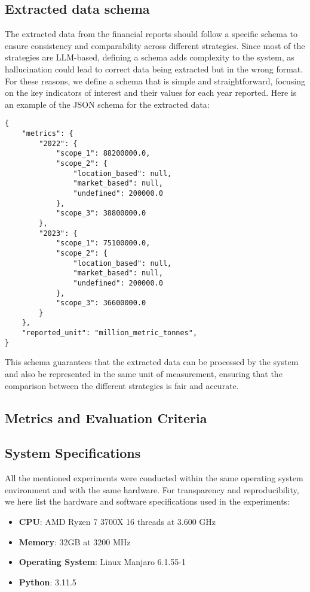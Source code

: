 \documentclass[english, 12pt, a4paper, elec, utf8, a-2b, online]{aaltothesis}
\begin{document}
\subsection{Extracted data schema}

The extracted data from the financial reports should follow a specific schema to ensure consistency and comparability across different strategies.
Since most of the strategies are \ac{LLM}-based, defining a schema adds complexity to the system, as hallucination could lead to correct data being extracted but in the wrong format.
For these reasons, we define a schema that is simple and straightforward, focusing on the key indicators of interest and their values for each year reported.
Here is an example of the \ac{JSON} schema for the extracted data:

\begin{verbatim}
{
    "metrics": {
        "2022": {
            "scope_1": 88200000.0,
            "scope_2": {
                "location_based": null,
                "market_based": null,
                "undefined": 200000.0
            },
            "scope_3": 38800000.0
        },
        "2023": {
            "scope_1": 75100000.0,
            "scope_2": {
                "location_based": null,
                "market_based": null,
                "undefined": 200000.0
            },
            "scope_3": 36600000.0
        }
    },
    "reported_unit": "million_metric_tonnes",
}
\end{verbatim}

This schema guarantees that the extracted data can be processed by the system and also be represented in the same unit of measurement, ensuring that the comparison between the different strategies is fair and accurate.

\subsection{Metrics and Evaluation Criteria}

\subsection{System Specifications}

All the mentioned experiments were conducted within the same operating system environment and with the same hardware.
For transparency and reproducibility, we here list the hardware and software specifications used in the experiments:

\begin{itemize}
    \item \textbf{CPU}: AMD Ryzen 7 3700X 16 threads at 3.600 GHz
    \item \textbf{Memory}: 32GB at 3200 MHz
    \item \textbf{Operating System}: Linux Manjaro 6.1.55-1
    \item \textbf{Python}: 3.11.5
\end{itemize}
\end{document}
